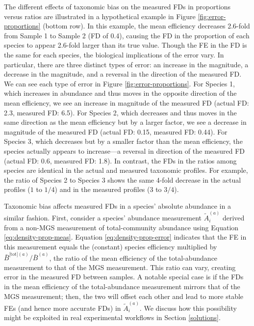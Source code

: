 \documentclass[
]{article}
\begin{document}
The different effects of taxonomic bias on the measured FDs in proportions versus ratios are illustrated in a hypothetical example in Figure \ref{fig:error-proportions} (bottom row).
In this example, the mean efficiency decreases 2.6-fold from Sample 1 to Sample 2 (FD of 0.4), causing the FD in the proportion of each species to appear 2.6-fold larger than its true value.
Though the FE in the FD is the same for each species, the biological implications of the error vary.
In particular, there are three distinct types of error: an increase in the magnitude, a decrease in the magnitude, and a reversal in the direction of the measured FD.
We can see each type of error in Figure \ref{fig:error-proportions}.
For Species 1, which increases in abundance and thus moves in the opposite direction of the mean efficiency, we see an increase in magnitude of the measured FD (actual FD: 2.3, measured FD: 6.5).
For Species 2, which decreases and thus moves in the same direction as the mean efficiency but by a larger factor, we see a decrease in magnitude of the measured FD (actual FD: 0.15, measured FD: 0.44).
For Species 3, which decreases but by a smaller factor than the mean efficiency, the species actually appears to increase---a reversal in direction of the measured FD (actual FD: 0.6, measured FD: 1.8).
In contrast, the FDs in the ratios among species are identical in the actual and measured taxonomic profiles.
For example, the ratio of Species 2 to Species 3 shows the same 4-fold decrease in the actual profiles (\(1\) to \(1/4\)) and in the measured profiles (\(3\) to \(3/4\)).

Taxonomic bias affects measured FDs in a species' absolute abundance in a similar fashion.
First, consider a species' abundance measurement \(\tilde A_i^{(a)}\) derived from a non-MGS measurement of total-community abundance using Equation \eqref{eq:density-prop-meas}.
Equation \eqref{eq:density-prop-error} indicates that the FE in this measurement equals the (constant) species efficiency multiplied by \({\bar B^{{\text{[tot]}}(a)}}/{\bar B^{(a)}}\), the ratio of the mean efficiency of the total-abundance measurement to that of the MGS measurement.
This ratio can vary, creating error in the measured FD between samples.
A notable special case is if the FDs in the mean efficiency of the total-abundance measurement mirrors that of the MGS measurement; then, the two will offset each other and lead to more stable FEs (and hence more accurate FDs) in \(\tilde A_i^{(a)}\).
We discuss how this possibility might be exploited in real experimental workflows in Section \ref{solutions}.
\end{document}
